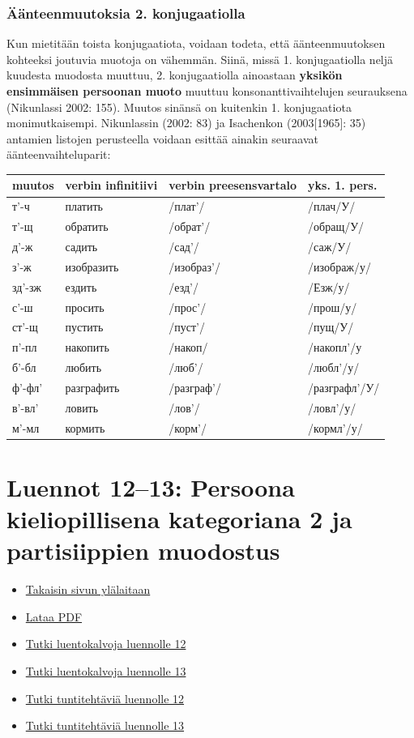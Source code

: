\documentclass[]{scrartcl}
\providecommand{\tightlist}{%
  \setlength{\itemsep}{0pt}\setlength{\parskip}{0pt}}
\begin{document}
\subsubsection{Äänteenmuutoksia 2.
konjugaatiolla}\label{uxe4uxe4nteenmuutoksia-2.-konjugaatiolla}

Kun mietitään toista konjugaatiota, voidaan todeta, että
äänteenmuutoksen kohteeksi joutuvia muotoja on vähemmän. Siinä, missä 1.
konjugaatiolla neljä kuudesta muodosta muuttuu, 2. konjugaatiolla
ainoastaan \textbf{yksikön ensimmäisen persoonan muoto} muuttuu
konsonanttivaihtelujen seurauksena (Nikunlassi 2002: 155). Muutos
sinänsä on kuitenkin 1. konjugaatiota monimutkaisempi. Nikunlassin
(2002: 83) ja Isachenkon (2003{[}1965{]}: 35) antamien listojen
perusteella voidaan esittää ainakin seuraavat äänteenvaihteluparit:

\begin{longtable}[c]{@{}llll@{}}
\toprule
muutos & verbin infinitiivi & verbin preesensvartalo & yks. 1.
pers.\tabularnewline
\midrule
\endhead
т'-ч & платить & /плат'/ & /плач/У/\tabularnewline
т'-щ & обратить & /обрат'/ & /обращ/У/\tabularnewline
д'-ж & садить & /сад'/ & /саж/У/\tabularnewline
з'-ж & изобразить & /изобраз'/ & /изображ/у/\tabularnewline
зд'-зж & ездить & /езд'/ & /Езж/у/\tabularnewline
с'-ш & просить & /прос'/ & /прош/у/\tabularnewline
ст'-щ & пустить & /пуст'/ & /пущ/У/\tabularnewline
п'-пл & накопить & /накоп/ & /накопл'/у\tabularnewline
б'-бл & любить & /люб'/ & /любл'/у/\tabularnewline
ф'-фл' & разграфить & /разграф'/ & /разграфл'/У/\tabularnewline
в'-вл' & ловить & /лов'/ & /ловл'/у/\tabularnewline
м'-мл & кормить & /корм'/ & /кормл'/у/\tabularnewline
\bottomrule
\end{longtable}

\section{Luennot 12--13: Persoona kieliopillisena kategoriana 2 ja
partisiippien
muodostus}\label{luennot-1213-persoona-kieliopillisena-kategoriana-2-ja-partisiippien-muodostus}

\begin{itemize}
\tightlist
\item
  \href{https://mustikka.uta.fi/~juho_harme/morfologia/\#tästä-kurssista}{Takaisin
  sivun ylälaitaan}
\item
  \href{http://mustikka.uta.fi/~juho_harme/morfologia/materiaalit/luento12.pdf}{Lataa
  PDF}
\item
  \href{http://mustikka.uta.fi/~juho_harme/morfologia/presentations/luento12.html}{Tutki
  luentokalvoja luennolle 12}
\item
  \href{http://mustikka.uta.fi/~juho_harme/morfologia/presentations/luento13.html}{Tutki
  luentokalvoja luennolle 13}
\item
  \href{http://mustikka.uta.fi/~juho_harme/morfologia/tehtavat/luento12.pdf}{Tutki
  tuntitehtäviä luennolle 12}
\item
  \href{http://mustikka.uta.fi/~juho_harme/morfologia/tehtavat/luento13.pdf}{Tutki
  tuntitehtäviä luennolle 13}
\end{itemize}
\end{document}
